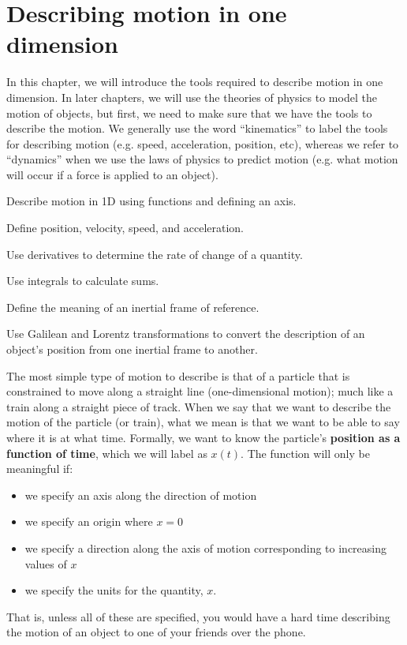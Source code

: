%
\chapter{Describing motion in one dimension}
\label{chap:3_Kinematics1D}
In this chapter, we will introduce the tools required to describe motion in one dimension. In later chapters, we will use the theories of physics to model the motion of objects, but first, we need to make sure that we have the tools to describe the motion. We generally use the word ``kinematics'' to label the tools for describing motion (e.g. speed, acceleration, position, etc), whereas we refer to ``dynamics'' when we use the laws of physics to predict motion (e.g. what motion will occur if a force is applied to an object). 
 \vspace{1cm}
\begin{learningObjectives}
\item Describe motion in 1D using functions and defining an axis.
\item Define position, velocity, speed, and acceleration.
\item Use derivatives to determine the rate of change of a quantity.
\item Use integrals to calculate sums.
\item Define the meaning of an inertial frame of reference.
\item Use Galilean and Lorentz transformations to convert the description of an object's position from one inertial frame to another.
\end{learningObjectives}


The most simple type of motion to describe is that of a particle that is constrained to move along a straight line (one-dimensional motion); much like a train along a straight piece of track. When we say that we want to describe the motion of the particle (or train), what we mean is that we want to be able to say where it is at what time. Formally, we want to know the particle's \textbf{position as a function of time}, which we will label as $x(t)$. The function will only be meaningful if:
\begin{itemize}
\item we specify an axis along the direction of motion
\item we specify an origin where $x=0$
\item we specify a direction along the axis of motion corresponding to increasing values of $x$
\item we specify the units for the quantity, $x$.
\end{itemize}
That is, unless all of these are specified, you would have a hard time describing the motion of an object to one of your friends over the phone. 

